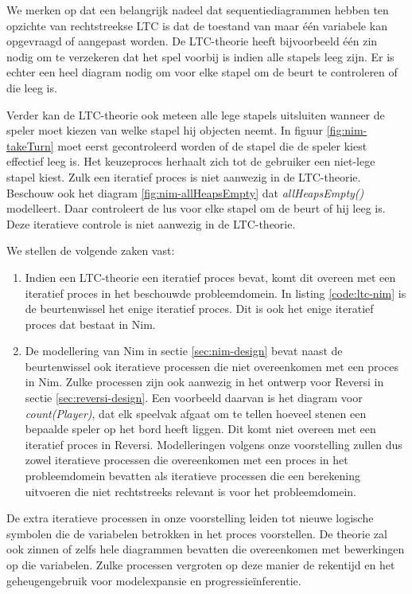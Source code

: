 We merken op dat een belangrijk nadeel dat sequentiediagrammen hebben ten opzichte van rechtstreekse LTC is dat de toestand van maar \'e\'en variabele kan opgevraagd of aangepast worden. De LTC-theorie heeft bijvoorbeeld \'e\'en zin nodig om te verzekeren dat het spel voorbij is indien alle stapels leeg zijn. Er is echter een heel diagram nodig om voor elke stapel om de beurt te controleren of die leeg is.

Verder kan de LTC-theorie ook meteen alle lege stapels uitsluiten wanneer de speler moet kiezen van welke stapel hij objecten neemt. In figuur \ref{fig:nim-takeTurn} moet eerst gecontroleerd worden of de stapel die de speler kiest effectief leeg is. Het keuzeproces herhaalt zich tot de gebruiker een niet-lege stapel kiest. Zulk een iteratief proces is niet aanwezig in de LTC-theorie. Beschouw ook het diagram \ref{fig:nim-allHeapsEmpty} dat \textit{allHeapsEmpty()} modelleert. Daar controleert de lus voor elke stapel om de beurt of hij leeg is. Deze iteratieve controle is niet aanwezig in de LTC-theorie.

We stellen de volgende zaken vast:

\begin{enumerate}
	\item Indien een LTC-theorie een iteratief proces bevat, komt dit overeen met een iteratief proces in het beschouwde probleemdomein. In listing \ref{code:ltc-nim} is de beurtenwissel het enige iteratief proces. Dit is ook het enige iteratief proces dat bestaat in Nim.
	\item De modellering van Nim in sectie \ref{sec:nim-design} bevat naast de beurtenwissel ook iteratieve processen die niet overeenkomen met een proces in Nim. Zulke processen zijn ook aanwezig in het ontwerp voor Reversi in sectie \ref{sec:reversi-design}. Een voorbeeld daarvan is het diagram voor \textit{count(Player)}, dat elk speelvak afgaat om te tellen hoeveel stenen een bepaalde speler op het bord heeft liggen. Dit komt niet overeen met een iteratief proces in Reversi. Modelleringen volgens onze voorstelling zullen dus zowel iteratieve processen die overeenkomen met een proces in het probleemdomein bevatten als iteratieve processen die een berekening uitvoeren die niet rechtstreeks relevant is voor het probleemdomein.
\end{enumerate}

De extra iteratieve processen in onze voorstelling leiden tot nieuwe logische symbolen die de variabelen betrokken in het proces voorstellen. De theorie zal ook zinnen of zelfs hele diagrammen bevatten die overeenkomen met bewerkingen op die variabelen. Zulke processen vergroten op deze manier de rekentijd en het geheugengebruik voor modelexpansie en progressie\"inferentie.

